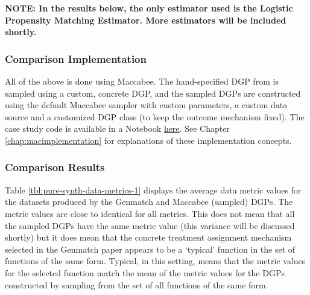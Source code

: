 \documentclass[../main.tex]{subfiles}
\begin{document}
\vspace{\baselineskip}

\textbf{NOTE: In the results below, the only estimator used is the Logistic Propensity Matching Estimator. More estimators will be included shortly.}

\subsubsection{Comparison Implementation}

All of the above is done using Maccabee. The hand-specified DGP from \textcite{Diamond2012GeneticStudies} is sampled using a custom, concrete DGP, and the sampled DGPs are constructed using the default Maccabee sampler with custom parameters, a custom data source and a customized DGP class (to keep the outcome mechanism fixed). The case study code is available in a Notebook \href{https://github.com/JoshBroomberg/Maccabee/blob/master/Notebooks/Genmatch\%20Benchmarking\%20Comparison.ipynb}{here}. See Chapter \ref{chap:macimplementation} for explanations of these implementation concepts.

\subsubsection{Comparison Results}

Table \ref{tbl:pure-synth-data-metrics-1} displays the average data metric values for the datasets produced by the Genmatch and Maccabee (sampled) DGPs. The metric values are close to identical for all metrics. This does not mean that all the sampled DGPs have the same metric value (this variance will be discussed shortly) but it does mean that the concrete treatment assignment mechanism selected in the Genmatch paper appears to be a `typical' function in the set of functions of the same form. Typical, in this setting, means that the metric values for the selected function match the mean of the metric values for the DGPs constructed by sampling from the set of all functions of the same form.
\end{document}
